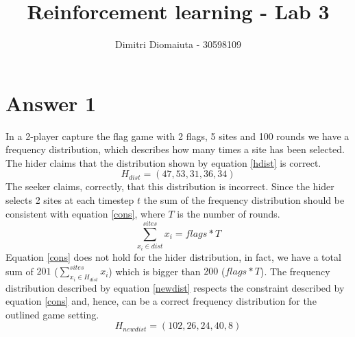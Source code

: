 \documentclass[runningheads]{llncs}
\begin{document}
%
\title{Reinforcement learning - Lab 3}
%
%
\author{Dimitri Diomaiuta - 30598109}
%
%
%
\maketitle              %
%
%
%
%

\section{Answer 1}
In a 2-player capture the flag game with 2 flags, 5 sites and 100
rounds we have a frequency distribution, which describes how many
times a site has been selected. The hider claims that the distribution
shown by equation \ref{hdist} is correct.
\begin{equation}\label{hdist}
H_{dist} = (47, 53, 31, 36, 34)
\end{equation}
The seeker claims, correctly, that this distribution is
incorrect. Since the hider selects 2 sites at each timestep $t$ the
sum of the frequency distribution should be consistent with equation
\ref{cons}, where $T$ is the number of rounds.
\begin{equation}\label{cons}
  \sum_{x_i \in dist}^{sites}x_i = flags * T
\end{equation}
Equation \ref{cons} does not hold for the hider distribution, in fact,
we have a total sum of $201$ ($\sum_{x_i \in H_{dist}}^{sites}x_i$)
which is bigger than $200$ ($flags * T$). The frequency distribution
described by equation \ref{newdist} respects the constraint described
by equation \ref{cons} and, hence, can be a correct frequency
distribution for the outlined game setting.
\begin{equation}\label{newdist}
  H_{newdist} = (102, 26, 24, 40, 8)
\end{equation}
\end{document}
